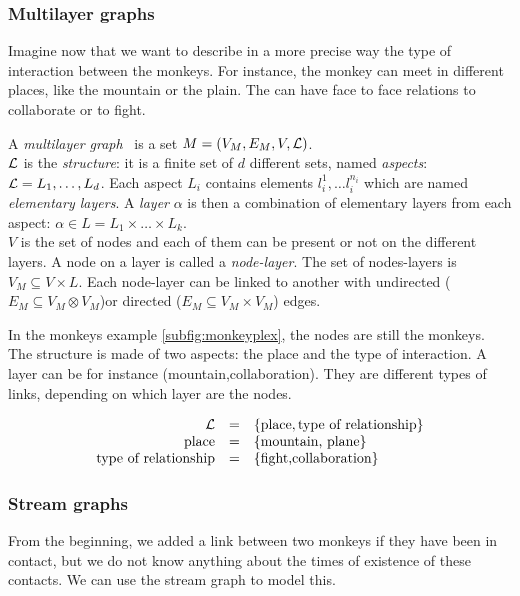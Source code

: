 \documentclass{svproc}
\begin{document}
\subsubsection{Multilayer graphs}
%
Imagine now that we want to describe in a more precise way the type of interaction between the monkeys. For instance, the monkey can meet in different places, like the mountain or the plain. The can have face to face relations to collaborate or to fight.

A {\em multilayer graph}~\cite{mlkiv,mldd} is a set $M=(V_M,E_M,V,{\cal L})$.\\
${\cal L}$ is the {\em structure}: it is a finite set of $d$ different sets, named {\em aspects}: ${\cal L} = L_1, \dots, L_d$. Each aspect $L_i$ contains elements $l_i^1,\dots l_i^{n_i}$ which are named {\em elementary layers}. A {\em layer} $\alpha$ is then a combination of elementary layers from each aspect: $\alpha \in L=L_1\times \dots \times L_k$. \\
$V$ is the set of nodes and each of them can be present or not on the different layers. A node on a layer is called a {\em node-layer}. The set of nodes-layers is $V_M \subseteq V \times L$. Each node-layer can be linked to another with undirected ($E_M\subseteq V_M \otimes V_M$)or directed ($E_M \subseteq V_M \times V_M$) edges.

In the monkeys example \cref{subfig:monkeyplex}, the nodes are still the monkeys. The structure is made of two aspects: the place and the type of interaction. A layer can be for instance (mountain,collaboration). They are different types of links, depending on which layer are the nodes.

\begin{equation}
\begin{array}{rcl}
  {\cal L}&=&\{\text{place},\text{type of relationship}\} \\
  \text{place} &=& \{\text{mountain, plane}\}\\
 \text{type of relationship} &=& \{ \text{fight,collaboration}\}
\end{array}
\end{equation}

\subsubsection{Stream graphs}
From the beginning, we added a link between two monkeys if they have been in contact, but we do not know anything about the times of existence of these contacts. We can use the stream graph to model this.
\end{document}
